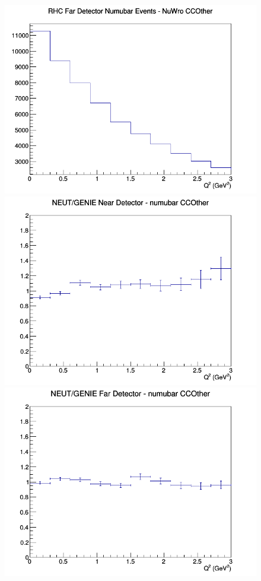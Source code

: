 \documentclass[12pt]{article}
\begin{document}
\begin{figure}[h]
\endminipage
{}
\includegraphics[width=\linewidth]{eff_Q2/LAr/CCOther_RHC_FD_numubar_Q2_NuWro.png}
\endminipage
\newline
{}
\includegraphics[width=\linewidth]{eff_Q2/LAr/ratios/CCOther_NEUT_GENIE_numubar_near_Q2.png}
\endminipage
{}
\includegraphics[width=\linewidth]{eff_Q2/LAr/ratios/CCOther_NEUT_GENIE_numubar_far_Q2.png}

\end{figure}
\end{document}
